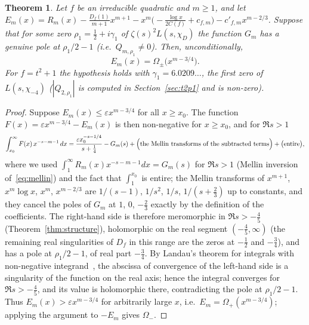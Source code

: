 \documentclass[11pt,a4paper]{article}
\newtheorem{theorem}{Theorem}
\theoremstyle{remark}\newtheorem{remark}[theorem]{Remark}
\begin{document}
\begin{theorem}\label{thm:omega}
Let $f$ be an irreducible quadratic and $m\ge1$, and let
$E_m(x)=R_m(x)-\frac{D_f(1)}{m+1}x^{m+1}-x^m\bigl(-\frac{\log x}{2C(f)}+c_{f,m}\bigr)-c'_{f,m}x^{m-2/3}$.
Suppose that for some zero $\rho_1=\tfrac12+i\gamma_1$ of $\zeta(s)^2L(s,\chi_D)$ the function $G_m$ has a genuine
pole at $\rho_1/2-1$ (i.e.\ $Q_{m,\rho_1}\ne0$). Then, unconditionally,
\[
E_m(x)=\Omega_\pm\bigl(x^{m-3/4}\bigr).
\]
For $f=t^2+1$ the hypothesis holds with $\gamma_1=6.0209\dots$, the first zero of $L(s,\chi_{-4})$
($|Q_{2,\rho_1}|$ is computed in Section~\ref{sec:t2p1} and is non-zero).
\end{theorem}
\begin{proof}
Suppose $E_m(x)\le\varepsilon x^{m-3/4}$ for all $x\ge x_0$. The function
$F(x)=\varepsilon x^{m-3/4}-E_m(x)$ is then non-negative for $x\ge x_0$, and for $\Re s>1$
\[
\int_{x_0}^\infty F(x)\,x^{-s-m-1}\,dx=\frac{\varepsilon x_0^{-s-1/4}}{s+\tfrac14}-G_m(s)+\Bigl(\text{the Mellin transforms of the subtracted terms}\Bigr)+\bigl(\text{entire}\bigr),
\]
where we used $\int_1^\infty R_m(x)x^{-s-m-1}dx=G_m(s)$ for $\Re s>1$ (Mellin inversion of~\eqref{eq:mellin})
and the fact that $\int_1^{x_0}$ is entire; the Mellin transforms of $x^{m+1}$, $x^m\log x$, $x^m$, $x^{m-2/3}$
are $1/(s-1)$, $1/s^2$, $1/s$, $1/(s+\tfrac23)$ up to constants, and they cancel the poles of $G_m$ at $1$, $0$,
$-\tfrac23$ exactly by the definition of the coefficients. The right-hand side is therefore meromorphic in
$\Re s>-\tfrac45$ (Theorem~\ref{thm:structure}), holomorphic on the real segment $(-\tfrac45,\infty)$ (the
remaining real singularities of $D_f$ in this range are the zeros at $-\tfrac12$ and $-\tfrac34$), and has a
pole at $\rho_1/2-1$, of real part $-\tfrac34$. By Landau's theorem for integrals with non-negative
integrand~\cite[Theorem~1.7]{MontgomeryVaughan2007}, the abscissa of convergence of the left-hand side
is a singularity of the function on the real axis; hence the integral converges for $\Re s>-\tfrac45$, and its
value is holomorphic there, contradicting the pole at $\rho_1/2-1$. Thus $E_m(x)>\varepsilon x^{m-3/4}$ for
arbitrarily large $x$, i.e.\ $E_m=\Omega_+(x^{m-3/4})$; applying the argument to $-E_m$ gives $\Omega_-$.
\end{proof}
\end{document}
